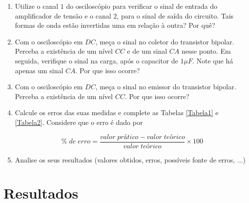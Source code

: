 \begin{enumerate}
	\item Utilize o canal $ 1 $ do osciloscópio para verificar o sinal de entrada do amplificador de tensão e o canal $ 2 $, para o sinal de saída do circuito. Tais formas de onda estão invertidas uma em relação à outra? Por quê?
	
	\item Com o osciloscópio em $ DC $, meça o sinal no coletor do transistor bipolar. Perceba a existência de um nível $ CC $ e de um sinal $ CA $ nesse ponto. Em seguida, verifique o sinal na  carga,  após  o  capacitor  de  $ 1\mu F $.  Note  que  há  apenas  um  sinal  $ CA $.  Por  que  isso ocorre? 
	
	\item Com o osciloscópio em $ DC $, meça o sinal no emissor do transistor bipolar. Perceba a existência de um nível $ CC $. Por que isso ocorre? 
	
	\item Calcule os erros das suas medidas e complete as Tabelas \ref{Tabela1} e \ref{Tabela2}. Considere que o erro é dado por 

$$\%\; de\; erro = \frac{valor \; prático - valor \; teórico}{valor \; teórico} \times 100$$

	\item Analise os seus resultados (valores obtidos, erros, possíveis fonte de erros, ...)

	
	
\end{enumerate}

\section{Resultados}


